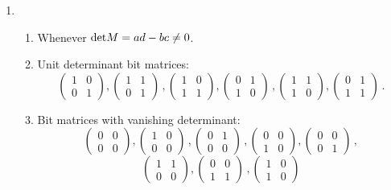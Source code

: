 \begin{enumerate}
\item 
\begin{enumerate}
\item Whenever ${\rm det} M=ad-bc\neq 0$.
\item Unit determinant bit matrices:
\[
\begin{pmatrix}
1&0\\0&1
\end{pmatrix},
\begin{pmatrix}
1&1\\0&1
\end{pmatrix}\, ,
\begin{pmatrix}
1&0\\1&1
\end{pmatrix},
\begin{pmatrix}
0&1\\1&0
\end{pmatrix}\, ,
\begin{pmatrix}
1&1\\1&0
\end{pmatrix},
\begin{pmatrix}
0&1\\1&1
\end{pmatrix}\,.
\]
\item Bit matrices with vanishing determinant:
\[
\begin{pmatrix}
0&0\\0&0
\end{pmatrix},
\begin{pmatrix}
1&0\\0&0
\end{pmatrix}\, ,
\begin{pmatrix}
0&1\\0&0
\end{pmatrix}\, ,
\begin{pmatrix}
0&0\\1&0
\end{pmatrix},
\begin{pmatrix}
0&0\\0&1
\end{pmatrix}\, ,\] \[
\begin{pmatrix}
1&1\\0&0
\end{pmatrix},
\begin{pmatrix}
0&0\\1&1
\end{pmatrix}\,,
\begin{pmatrix}
1&0\\1&0

\end{pmatrix}\]
\end{enumerate}
\end{enumerate}
